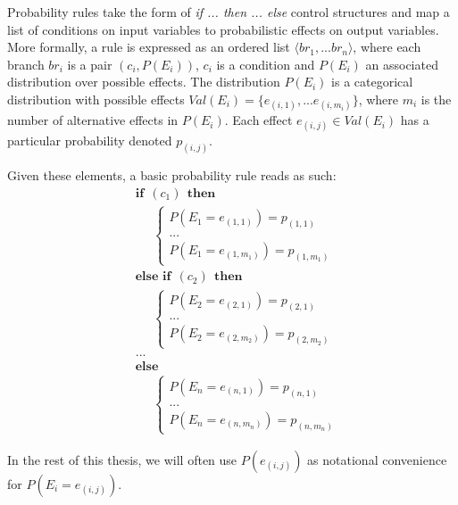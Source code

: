 Probability rules take the form of \textit{if ... then ... else} control structures and map a list of conditions on input variables to probabilistic effects on output variables. More formally, a rule is expressed as an ordered list $\langle br_1, ... br_{n}\rangle$, where each branch $br_i$ is a pair $(c_i, P(E_i))$, $c_i$ is a condition and $P(E_i)$ an associated distribution over possible effects.  The distribution $P(E_i)$ is a categorical distribution with possible effects $Val(E_i) = \{e_{(i,1)},... e_{(i,m_i)}\}$, where $m_i$ is the number of alternative effects in $P(E_i)$.  Each effect $e_{(i,j)} \in Val(E_i)$ has a particular probability denoted $p_{(i,j)}$. 

Given these elements, a basic probability rule reads as such:
\begin{equation}
\begin{aligned}
& \textbf{if} \ \ (c_{1}) \ \ \textbf{then} \\ 
& \;\;\;\;\; \begin{cases}
P(E_1\!=\!e_{(1,1)}) = p_{(1,1)} \\
 ... \\
P(E_1\!=\!e_{(1,m_1)}) = p_{(1,m_1)} 
\end{cases} \\[3mm]
& \textbf{else if} \ \ (c_{2}) \ \ \textbf{then} \\ 
& \;\;\;\;\; \begin{cases}
P(E_2\!=\!e_{(2,1)}) = p_{(2,1)} \\
 ... \\
P(E_2\!=\!e_{(2,m_2)}) = p_{(2,m_2)}
\end{cases} \\ 
& ...  \\
& \textbf{else} \\
& \;\;\;\;\; \begin{cases}
P(E_{n}\!=\!e_{(n,1)}) = p_{(n,1)} \\
... \\
P(E_{n}\!=\!e_{(n,m_n)}) = p_{(n,m_n)}
\end{cases}
\end{aligned}
\label{eq:probrule}
\end{equation}

 In the rest of this thesis, we will often use $P(e_{(i,j)})$ as notational convenience for $P(E_i = e_{(i,j)})$.   


